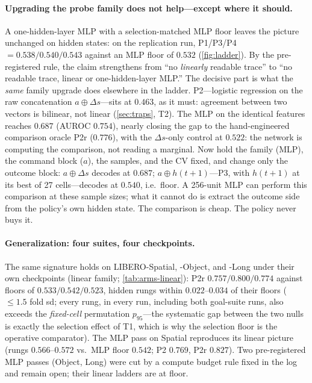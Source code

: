 \documentclass{article}
\begin{document}
\paragraph{Upgrading the probe family does not help---except where it
should.}
\label{sec:results-cheap}
A one-hidden-layer MLP with a selection-matched MLP floor leaves the picture
unchanged on hidden states: on the replication run, P1/P3/P4
$=0.538/0.540/0.543$ against an MLP floor of $0.532$ (\cref{fig:ladder}).
By the pre-registered rule, the claim strengthens from ``no \emph{linearly}
readable trace'' to ``no readable trace, linear or one-hidden-layer MLP.''
The decisive part is what the \emph{same} family upgrade does elsewhere in
the ladder. P2---logistic regression on the raw concatenation
$a\oplus\Delta s$---sits at $0.463$, as it must: agreement between two
vectors is bilinear, not linear (\cref{sec:traps}, T2). The MLP on the
identical features reaches $0.687$ (AUROC $0.754$), nearly closing the gap
to the hand-engineered comparison oracle P2r ($0.776$), with the
$\Delta s$-only control at $0.522$: the network is computing the
comparison, not reading a marginal. Now hold the family (MLP), the command
block ($a$), the samples, and the CV fixed, and change only the outcome
block: $a\oplus\Delta s$ decodes at $0.687$; $a\oplus h(t{+}1)$---P3, with
$h(t{+}1)$ at its best of 27 cells---decodes at $0.540$, i.e.\ floor. A
256-unit MLP can perform this comparison at these sample sizes;
what it cannot do is extract the outcome side from the policy's own hidden
state. The comparison is cheap. The policy never buys it.

\paragraph{Generalization: four suites, four checkpoints.}
The same signature holds on LIBERO-Spatial, -Object, and -Long under their
own checkpoints (linear family; \cref{tab:arms-linear}): P2r $0.757/0.800/
0.774$ against floors of $0.533/0.542/0.523$, hidden rungs within
$0.022$--$0.034$ of their floors ($\leq\!1.5$ fold sd; every rung, in every
run, including both goal-suite runs, also exceeds the \emph{fixed-cell}
permutation $p_{95}$---the systematic gap between the two nulls is exactly
the selection effect of T1, which is why the selection floor is the
operative comparator). The MLP pass on Spatial reproduces its linear
picture (rungs $0.566$--$0.572$ vs.\ MLP floor $0.542$; P2 $0.769$, P2r
$0.827$). Two pre-registered MLP passes (Object, Long) were cut by a
compute budget rule fixed in the log and remain open; their linear ladders
are at floor.
\end{document}
